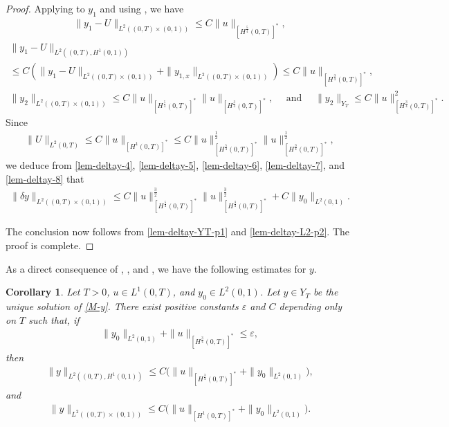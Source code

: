 \documentclass[11pt, reqno]{amsart}
\theoremstyle{plain}
\newtheorem{corollary}[thm]{Corollary}
\numberwithin{equation}{section}
\begin{document}
\begin{proof}
Applying  to $y_1$ and using , we have
\begin{align}	\label{lem-deltay-5}
\|y_1 - U\|_{L^2((0, T) \times (0, 1))} \leq C \|u \|_{[H^{\frac{5}{4}}(0, T)]^*},
\end{align}
\begin{multline}	\label{lem-deltay-6}
\|y_1 - U\|_{L^2((0, T), H^1(0, 1))} \\[6pt]
\leq C \left(\|y_1 - U\|_{L^2((0, T) \times (0, 1))} + \|y_{1,x}\|_{L^2((0, T) \times (0, 1))}  \right) 
\leq C \|u\|_{[H^{\frac{3}{4}}(0, T)]^*},
\end{multline}
\begin{align}	\label{lem-deltay-7}
 \|y_2\|_{L^2((0, T) \times (0, 1))} \leq C \|u\|_{[H^{\frac{5}{4}} (0, T)]^*} \|u\|_{[H^{\frac{3}{4}}(0, T)]^*}, \quad \mbox{ and } \quad \|y_2\|_{Y_T} \le C \|u\|_{[H^{\frac{3}{4}}(0, T)]^*}^2. 
\end{align}
Since
\begin{align}	\label{lem-deltay-8}
	\|U \|_{L^2(0, T)} \leq C \|u\|_{[H^1(0, T)]^*} \leq C \|u\|_{[H^{\frac{5}{4}}(0, T)]^*}^{\frac{1}{2}}   \|u\|_{[H^{\frac{3}{4}}(0, T)]^*}^{\frac{1}{2}}, 
\end{align}
we deduce from \eqref{lem-deltay-4}, \eqref{lem-deltay-5}, \eqref{lem-deltay-6}, \eqref{lem-deltay-7}, and \eqref{lem-deltay-8} that
\begin{align} \label{lem-deltay-L2-p2}
\|\delta y\|_{L^2((0, T) \times (0, 1))} \leq C \| u\|_{[H^{\frac{5}{4}}(0, T)]^*}^{\frac{3}{2}}  \| u\|_{[H^{\frac{3}{4}}(0, T)]^*}^{\frac{3}{2}} +  C \|y_0\|_{L^2(0, 1)}. 
\end{align}

The conclusion now follows from \eqref{lem-deltay-YT-p1} and \eqref{lem-deltay-L2-p2}.  The proof is complete. 
\end{proof}

As a direct consequence of  , , and , we have the following estimates for $y$.

\begin{corollary}\label{cor-y} Let $T > 0$, $u \in L^1(0, T)$, and $y_0 \in L^2(0, 1)$. Let $y \in Y_T$ be the unique solution of  \eqref{M-y}. 
There exist positive constants $\varepsilon$ and $C$ depending only on $T$ such that, if 
\begin{align}
\|y_0\|_{L^2(0, 1)} + \|u\|_{[H^{\frac{3}{4}}(0, T)]^*} \leq \varepsilon, 
\end{align}
then
\begin{align}	\label{cor-y-1}
	\|y\|_{L^2((0, T), H^1(0, 1))} \leq C \Big( \|u\|_{[H^{\frac{3}{4}}(0, T)]^*} + \|y_0\|_{L^2(0, 1)} \Big),
\end{align}
and
\begin{align}	\label{cor-y-2}
	\|  y\|_{L^2((0, T) \times (0, 1))} \leq  C \Big( \|u\|_{[H^{1}(0, T)]^*} +  \|y_0\|_{L^2(0, 1)} \Big).
\end{align}
\end{corollary}
\end{document}

